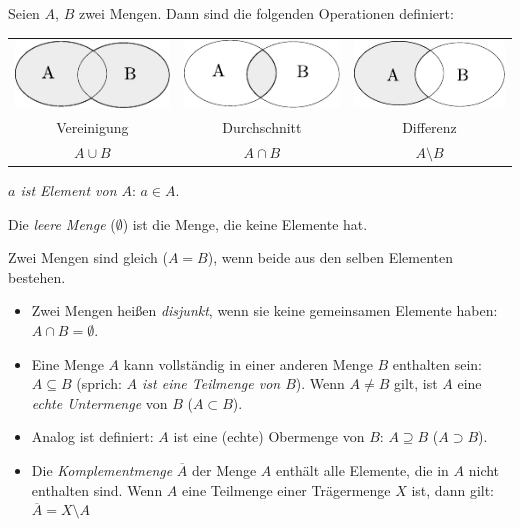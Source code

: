 Seien $A$, $B$ zwei Mengen. Dann sind die folgenden Operationen definiert:

\begin{tabular}{ccc}
 \includegraphics{img/vereinigung.pdf} &
 \includegraphics{img/durchschnitt.pdf} &
 \includegraphics{img/differenz.pdf} \\
 Vereinigung & Durchschnitt & Differenz \\
 $A \cup B$ & $A \cap B$ & $A \setminus B$
\end{tabular}

\vspace{1em}\par

\emph{$a$ ist Element von $A$}: $a\in A$.

Die \emph{leere Menge} ($\emptyset$) ist die Menge, die keine Elemente hat.

Zwei Mengen sind gleich ($A=B$), wenn beide aus den selben Elementen bestehen.

\begin{itemize}
\item Zwei Mengen heißen \emph{disjunkt}, wenn sie keine gemeinsamen Elemente haben:
$A\cap B = \emptyset$.

\item Eine Menge $A$ kann vollständig in einer anderen Menge $B$ enthalten sein: 
$A\subseteq B$ (sprich: \emph{$A$ ist eine Teilmenge von $B$}). Wenn $A\neq B$ 
gilt, ist $A$ eine \emph{echte Untermenge} von $B$ ($A \subset B$).

\item Analog ist definiert: $A$ ist eine (echte) Obermenge von $B$: $A \supseteq B$ 
($A \supset B$).

\item Die \emph{Komplementmenge} $\overline{A}$ der Menge $A$ enthält alle Elemente,
die in $A$ nicht enthalten sind. Wenn $A$ eine Teilmenge einer Trägermenge $X$
ist, dann gilt: $\overline{A} = X\setminus A$

\end{itemize}

